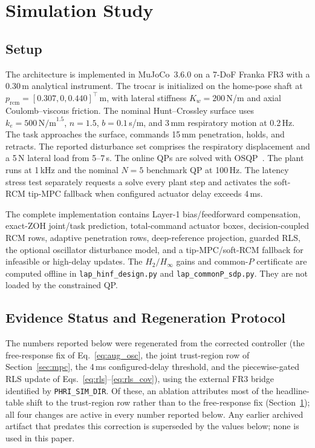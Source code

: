 \section{Simulation Study}\label{sec:sim}

\subsection{Setup}

The architecture is implemented in MuJoCo~3.6.0 on a 7-DoF Franka FR3 with a 0.30\,m analytical instrument. The trocar is initialized on the home-pose shaft at $p_{\text{rcm}}=[0.307,0,0.440]^\top$\,m, with lateral stiffness $K_w=200$\,N/m and axial Coulomb--viscous friction. The nominal Hunt--Crossley surface uses $k_e=500\,\mathrm{N/m}^{1.5}$, $n=1.5$, $b=0.1$\,s/m, and 3\,mm respiratory motion at 0.2\,Hz. The task approaches the surface, commands 15\,mm penetration, holds, and retracts. The reported disturbance set comprises the respiratory displacement and a 5\,N lateral load from 5--7\,s. The online QPs are solved with OSQP~\cite{osqp}. The plant runs at 1\,kHz and the nominal $N=5$ benchmark QP at 100\,Hz. The latency stress test separately requests a solve every plant step and activates the soft-RCM tip-MPC fallback when configured actuator delay exceeds 4\,ms.

The complete implementation contains Layer-1 bias/feedforward compensation, exact-ZOH joint/task prediction, total-command actuator boxes, decision-coupled RCM rows, adaptive penetration rows, deep-reference projection, guarded RLS, the optional oscillator disturbance model, and a tip-MPC/soft-RCM fallback for infeasible or high-delay updates. The $H_2/H_\infty$ gains and common-$P$ certificate are computed offline in \texttt{lap\_hinf\_design.py} and \texttt{lap\_commonP\_sdp.py}. They are not loaded by the constrained QP.

\subsection{Evidence Status and Regeneration Protocol}\label{sec:evidence-status}

The numbers reported below were regenerated from the corrected controller
(the free-response fix of Eq.~\eqref{eq:aug_osc}, the joint trust-region row
of Section~\ref{sec:mpc}, the 4\,ms configured-delay threshold, and the
piecewise-gated RLS update of Eqs.~\eqref{eq:rls}--\eqref{eq:rls_cov}), using
the external FR3 bridge identified by \texttt{PHRI\_SIM\_DIR}. Of these, an
ablation attributes most of the headline-table shift to the trust-region row
rather than to the free-response fix (Section~\ref{sec:sim}); all four
changes are active in every number reported below. Any earlier archived
artifact that predates this correction is superseded by the values below;
none is used in this paper.

